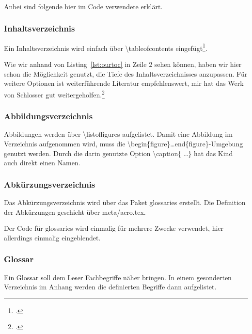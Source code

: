 
Anbei sind folgende hier im Code verwendete erklärt.
\subsubsection{Inhaltsverzeichnis}%
\label{sec:toc}
Ein Inhaltsverzeichnis wird einfach über \textbackslash tableofcontents eingefügt\footcite[Vgl. ][S. 7ff]{ochsner_textverarbeitungssystem_2015}.



Wie wir anhand von Listing~\ref{lst:ourtoc} in Zeile 2 sehen können, haben wir hier schon die Möglichkeit genutzt, die Tiefe des Inhaltsverzeichnisses anzupassen. Für weitere Optionen ist weiterführende Literatur empfehlenswert, mir hat das Werk von Schlosser gut weitergeholfen.\footcite[Vgl. ][S. 207ff.]{schlosser_wissenschaftliche_2014}
\subsubsection{Abbildungsverzeichnis}%
\label{sec:lof}
Abbildungen werden über \textbackslash listoffigures aufgelistet. Damit eine Abbildung im Verzeichnis aufgenommen wird, muss die \textbackslash begin\{figure\}\ldots end\{figure\}-Umgebung genutzt werden. Durch die darin genutzte Option \textbackslash caption\{ \ldots \} hat das Kind auch direkt einen Namen.
\subsubsection{Abkürzungsverzeichnis}%
\label{sec:acros}
Das Abkürzungsverzeichnis wird über das Paket glossaries erstellt. Die Definition der Abkürzungen geschieht über meta/acro.tex.

Der Code für glossaries wird einmalig für mehrere Zwecke verwendet, hier allerdings einmalig eingeblendet.


\subsubsection{Glossar}%
\label{sec:glossaries}
Ein Glossar soll dem Leser Fachbegriffe näher bringen. In einem gesonderten Verzeichnis im Anhang werden die definierten Begriffe dann aufgelistet.

